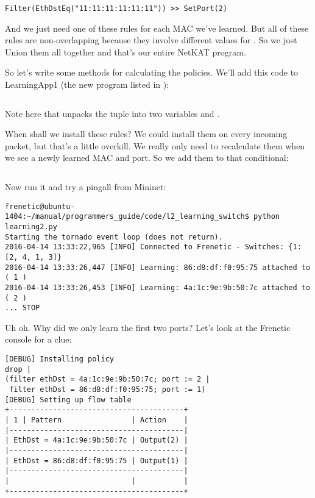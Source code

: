 \begin{verbatim}
Filter(EthDstEq("11:11:11:11:11:11")) >> SetPort(2)
\end{verbatim}

And we just need one of these rules for each MAC we've learned.  But all of these rules are non-overlapping
because they involve different values for .  So we just Union them all together and that's
our entire NetKAT program.

So let's write some methods for calculating the policies.
We'll add this code to LearningApp1 (the new program listed in ):

\inputminted[firstline=23,lastline=31]{python}{code/l2_learning_switch/learning2.py}

Note here that  unpacks the tuple  into two variables
 and .

When shall we install these rules?   We could install them on every incoming packet, but that's a little
overkill. We really only need to recalculate them when we see a newly learned MAC and port.  So we add them
to that conditional:

\inputminted[firstline=41,lastline=43]{python}{code/l2_learning_switch/learning2.py}

Now run it and try a pingall from Mininet:

\begin{verbatim}
frenetic@ubuntu-1404:~/manual/programmers_guide/code/l2_learning_switch$ python learning2.py
Starting the tornado event loop (does not return).
2016-04-14 13:33:22,965 [INFO] Connected to Frenetic - Switches: {1: [2, 4, 1, 3]}
2016-04-14 13:33:26,447 [INFO] Learning: 86:d8:df:f0:95:75 attached to ( 1 )
2016-04-14 13:33:26,453 [INFO] Learning: 4a:1c:9e:9b:50:7c attached to ( 2 )
... STOP
\end{verbatim}

Uh oh.  Why did we only learn the first two ports?   Let's look at the Frenetic console for a clue:

\begin{verbatim}
[DEBUG] Installing policy
drop |
(filter ethDst = 4a:1c:9e:9b:50:7c; port := 2 |
 filter ethDst = 86:d8:df:f0:95:75; port := 1)
[DEBUG] Setting up flow table
+----------------------------------------+
| 1 | Pattern                | Action    |
|----------------------------------------|
| EthDst = 4a:1c:9e:9b:50:7c | Output(2) |
|----------------------------------------|
| EthDst = 86:d8:df:f0:95:75 | Output(1) |
|----------------------------------------|
|                            |           |
+----------------------------------------+
\end{verbatim}


